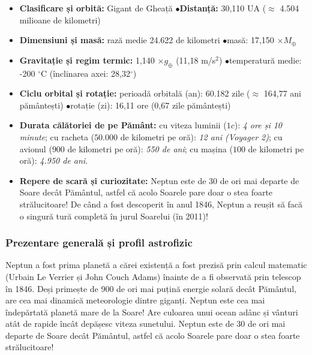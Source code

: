 \begin{tcolorbox}[orbitardata, title={\textbf{Repere esențiale: Neptun}}]
\small
\begin{itemize}[leftmargin=1.4em, itemsep=2pt, topsep=2pt]
  \item \textbf{Clasificare și orbită:} Gigant de Gheață \quad$\bullet$\quad \textbf{Distanță:} 30,110 UA ($\approx$ 4.504 milioane de kilometri)
  \item \textbf{Dimensiuni și masă:} rază medie 24.622 de kilometri \quad$\bullet$\quad masă: 17,150 $\times M_\oplus$
  \item \textbf{Gravitație și regim termic:} 1,140 $\times g_\oplus$ (11,18 m/s$^2$) \quad$\bullet$\quad temperatură medie: -200 $^\circ$C (înclinarea axei: 28,32$^\circ$)
  \item \textbf{Ciclu orbital și rotație:} perioadă orbitală (an): 60.182 zile ($\approx$ 164,77 ani pământești) \quad$\bullet$\quad rotație (zi): 16,11 ore (0,67 zile pământești)
  \item \textbf{Durata călătoriei de pe Pământ:} cu viteza luminii ($1c$): \emph{4 ore și 10 minute}; cu racheta ($50.000$ de kilometri pe oră): \emph{12 ani (Voyager 2)}; cu avionul ($900$ de kilometri pe oră): \emph{550 de ani}; cu mașina ($100$ de kilometri pe oră): \emph{4.950 de ani}.
  \item \textbf{Repere de scară și curiozitate:} Neptun este de 30 de ori mai departe de Soare decât Pământul, astfel că acolo Soarele pare doar o stea foarte strălucitoare! De când a fost descoperit în anul 1846, Neptun a reușit să facă o singură tură completă în jurul Soarelui (în 2011)!
\end{itemize}
\end{tcolorbox}

\subsubsection*{Prezentare generală și profil astrofizic}
Neptun a fost prima planetă a cărei existență a fost prezisă prin calcul matematic (Urbain Le Verrier și John Couch Adams) înainte de a fi observată prin telescop în 1846. Deși primește de 900 de ori mai puțină energie solară decât Pământul, are cea mai dinamică meteorologie dintre giganți. Neptun este cea mai îndepărtată planetă mare de la Soare! Are culoarea unui ocean adânc și vânturi atât de rapide încât depășesc viteza sunetului. Neptun este de 30 de ori mai departe de Soare decât Pământul, astfel că acolo Soarele pare doar o stea foarte strălucitoare!

